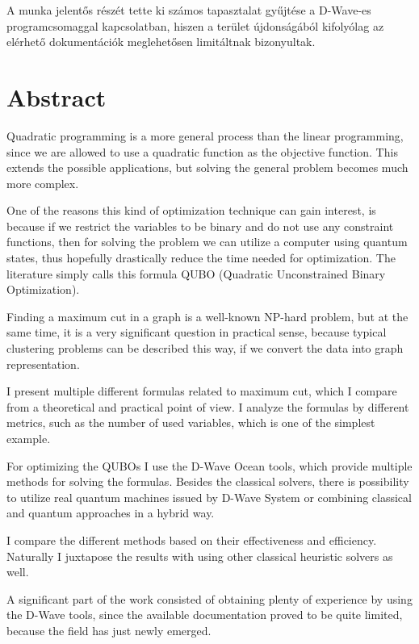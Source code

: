 A munka jelentős részét tette ki számos tapasztalat gyűjtése a D-Wave-es programcsomaggal kapcsolatban, hiszen a terület újdonságából kifolyólag az elérhető dokumentációk meglehetősen limitáltnak bizonyultak.

\vfill
\selectenglish


\chapter*{Abstract}

Quadratic programming is a more general process than the linear programming, since we are allowed to use a quadratic function as the objective function. This extends the possible applications, but solving the general problem becomes much more complex.

One of the reasons this kind of optimization technique can gain interest, is because if we restrict the variables to be binary and do not use any constraint functions, then for solving the problem we can utilize a computer using quantum states, thus hopefully drastically reduce the time needed for optimization. The literature simply calls this formula QUBO (Quadratic Unconstrained Binary Optimization).

Finding a maximum cut in a graph is a well-known NP-hard problem, but at the same time, it is a very significant question in practical sense, because typical clustering problems can be described this way, if we convert the data into graph representation.

I present multiple different formulas related to maximum cut, which I compare from a theoretical and practical point of view. I analyze the formulas by different metrics, such as the number of used variables, which is one of the simplest example.

For optimizing the QUBOs I use the D-Wave Ocean tools, which provide multiple methods for solving the formulas. Besides the classical solvers, there is possibility to utilize real quantum machines issued by D-Wave System or combining classical and quantum approaches in a hybrid way. 

I compare the different methods based on their effectiveness and efficiency. Naturally I juxtapose the results with using other classical heuristic solvers as well.

A significant part of the work consisted of obtaining plenty of experience by using the D-Wave tools, since the available documentation proved to be quite limited, because the field has just newly emerged.


\vfill
\selectthesislanguage

\setcounter{romanPage}{\value{page}}
